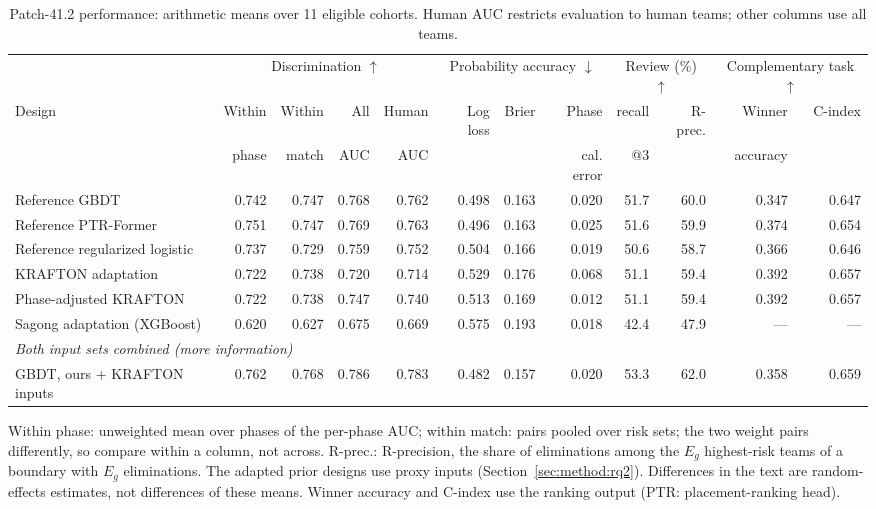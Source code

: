 \begin{table}[t]
\centering\footnotesize
\caption{Patch-41.2 performance: arithmetic means over 11 eligible cohorts. Human AUC restricts evaluation to human teams; other columns use all teams.}
\label{tab:main}
\setlength{\tabcolsep}{2.5pt}
\begin{tabular*}{\textwidth}{@{\extracolsep{\fill}}lrrrrrrrrrrr@{}}
\toprule
 & \multicolumn{4}{c}{Discrimination $\uparrow$} & \multicolumn{3}{c}{Probability accuracy $\downarrow$} & \multicolumn{2}{c}{Review (\%) $\uparrow$} & \multicolumn{2}{c}{Complementary task $\uparrow$} \\
\cmidrule(lr){2-5}\cmidrule(lr){6-8}\cmidrule(lr){9-10}\cmidrule(lr){11-12}
Design & Within & Within & All & Human & Log loss & Brier & Phase & recall & R-prec. & Winner & C-index \\
 & phase & match & AUC & AUC &  &  & cal. error & @3 &  & accuracy &  \\
\midrule
Reference GBDT & 0.742 & 0.747 & 0.768 & 0.762 & 0.498 & 0.163 & 0.020 & 51.7 & 60.0 & 0.347 & 0.647 \\
Reference PTR-Former & 0.751 & 0.747 & 0.769 & 0.763 & 0.496 & 0.163 & 0.025 & 51.6 & 59.9 & 0.374 & 0.654 \\
Reference regularized logistic & 0.737 & 0.729 & 0.759 & 0.752 & 0.504 & 0.166 & 0.019 & 50.6 & 58.7 & 0.366 & 0.646 \\
KRAFTON adaptation & 0.722 & 0.738 & 0.720 & 0.714 & 0.529 & 0.176 & 0.068 & 51.1 & 59.4 & 0.392 & 0.657 \\
Phase-adjusted KRAFTON & 0.722 & 0.738 & 0.747 & 0.740 & 0.513 & 0.169 & 0.012 & 51.1 & 59.4 & 0.392 & 0.657 \\
Sagong adaptation (XGBoost) & 0.620 & 0.627 & 0.675 & 0.669 & 0.575 & 0.193 & 0.018 & 42.4 & 47.9 & --- & --- \\
\midrule
\multicolumn{12}{l}{\emph{Both input sets combined (more information)}} \\
GBDT, ours + KRAFTON inputs & 0.762 & 0.768 & 0.786 & 0.783 & 0.482 & 0.157 & 0.020 & 53.3 & 62.0 & 0.358 & 0.659 \\
\bottomrule
\end{tabular*}
\smallskip
\parbox{\textwidth}{\scriptsize Within phase: unweighted mean over phases of the per-phase AUC; within match: pairs pooled over risk sets; the two weight pairs differently, so compare within a column, not across. R-prec.: R-precision, the share of eliminations among the $E_g$ highest-risk teams of a boundary with $E_g$ eliminations. The adapted prior designs use proxy inputs (Section~\ref{sec:method:rq2}). Differences in the text are random-effects estimates, not differences of these means. Winner accuracy and C-index use the ranking output (PTR: placement-ranking head).}
\end{table}
